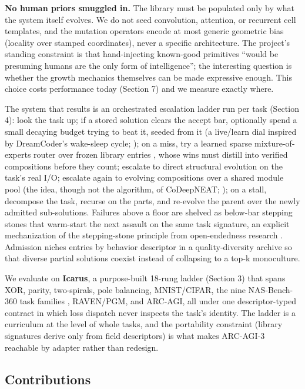 \documentclass[11pt]{article}
\begin{document}
\textbf{No human priors smuggled in.} The library must be populated only by what the system itself evolves. We do not seed convolution, attention, or recurrent cell templates, and the mutation operators encode at most generic geometric bias (locality over stamped coordinates), never a specific architecture. The project's standing constraint is that hand-injecting known-good primitives ``would be presuming humans are the only form of intelligence''; the interesting question is whether the growth mechanics themselves can be made expressive enough. This choice costs performance today (Section 7) and we measure exactly where.

The system that results is an orchestrated escalation ladder run per task (Section 4): look the task up; if a stored solution clears the accept bar, optionally spend a small decaying budget trying to beat it, seeded from it (a live/learn dial inspired by DreamCoder's wake-sleep cycle; \citealp{ellis2021}); on a miss, try a learned sparse mixture-of-experts router over frozen library entries \citep{jacobs1991, shazeer2017}, whose wins must distill into verified compositions before they count; escalate to direct structural evolution on the task's real I/O; escalate again to evolving compositions over a shared module pool (the idea, though not the algorithm, of CoDeepNEAT; \citealp{miikkulainen2017}); on a stall, decompose the task, recurse on the parts, and re-evolve the parent over the newly admitted sub-solutions. Failures above a floor are shelved as below-bar stepping stones that warm-start the next assault on the same task signature, an explicit mechanization of the stepping-stone principle from open-endedness research \citep{lehman2011, ecoffet2021}. Admission niches entries by behavior descriptor in a quality-diversity archive \citep{mouret2015, pugh2016} so that diverse partial solutions coexist instead of collapsing to a top-k monoculture.

We evaluate on \textbf{Icarus}, a purpose-built 18-rung ladder (Section 3) that spans XOR, parity, two-spirals, pole balancing, MNIST/CIFAR, the nine NAS-Bench-360 task families \citep{tu2022}, RAVEN/PGM, and ARC-AGI, all under one descriptor-typed contract in which loss dispatch never inspects the task's identity. The ladder is a curriculum \citep{bengio2009} at the level of whole tasks, and the portability constraint (library signatures derive only from field descriptors) is what makes ARC-AGI-3 \citep{arcprize2026} reachable by adapter rather than redesign.

\subsection*{Contributions}
\end{document}
